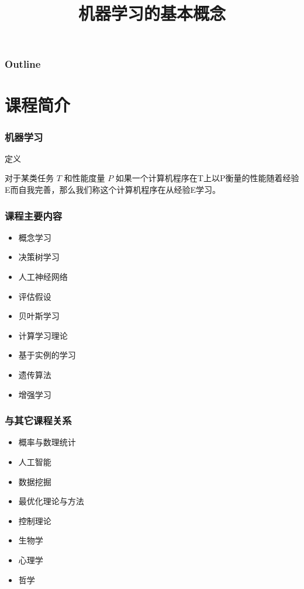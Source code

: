 \documentclass{beamer}
\title{机器学习的基本概念}
\author{}
\date{}
\begin{document}
\maketitle

\begin{frame}
\frametitle{Outline}
\setcounter{tocdepth}{3}
\tableofcontents
\end{frame}













\section{课程简介}
\label{sec-1}
\begin{frame}
\frametitle{机器学习}
\label{sec-1-1}
\begin{block}{定义}
\label{sec-1-1-1}

 对于某类任务 $T$ 和性能度量 $P$ 如果一个计算机程序在T上以P衡量的性能随着经验E而自我完善，那么我们称这个计算机程序在从经验E学习。
\end{block}
\end{frame}
\begin{frame}
\frametitle{课程主要内容}
\label{sec-1-2}


\begin{itemize}
\item 概念学习
\item 决策树学习
\item 人工神经网络
\item 评估假设
\item 贝叶斯学习
\item 计算学习理论
\item 基于实例的学习
\item 遗传算法
\item 增强学习
\end{itemize}
\end{frame}
\begin{frame}
\frametitle{与其它课程关系}
\label{sec-1-3}


\begin{itemize}
\item 概率与数理统计
\item 人工智能
\item 数据挖掘
\item 最优化理论与方法
\item 控制理论
\item 生物学
\item 心理学
\item 哲学
\end{itemize}
\end{frame}
\end{document}
